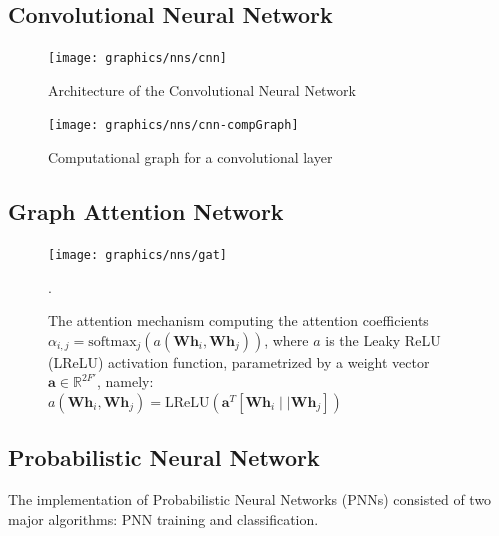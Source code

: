 	\subsection{Convolutional Neural Network} \label{Section: impl/ml/cnn}
	\begin{figure}[H]
		\centering
		\texttt{[image: graphics/nns/cnn]}
		\caption{Architecture of the Convolutional Neural Network}
		\label{Fig: impl/ml/cnn/architecture}
	\end{figure}
	
	\begin{figure}[H]
		\centering
		\texttt{[image: graphics/nns/cnn-compGraph]}
		\caption{Computational graph for a convolutional layer}
		\label{Fig: impl/ml/cnn/compGraph}
	\end{figure}
	
	\subsection{Graph Attention Network} \label{Section: impl/ml/gat}
	\begin{figure}[H]
		\centering
		\texttt{[image: graphics/nns/gat]}	
		\caption[Attention mechanism]{The attention mechanism computing the attention coefficients \\ $\alpha_{i,j}=\text{softmax}_j(a(\mathbf{Wh}_i, \mathbf{Wh}_j))$, where $a$ is the Leaky ReLU (LReLU) activation function, parametrized by a weight vector $\mathbf{a}\in\mathbb{R}^{2F'}$, namely: \\  $a(\mathbf{Wh}_i, \mathbf{Wh}_j)=\text{LReLU}(\mathbf{a}^T[\mathbf{Wh}_i\mid\mid\mathbf{Wh}_j])$}.
		\label{Fig: impl/attn-mechanism}
	\end{figure}
	\subsection{Probabilistic Neural Network} \label{Section: impl/ml/pnn}
	The implementation of Probabilistic Neural Networks (PNNs) consisted of two major algorithms: PNN training and classification.
